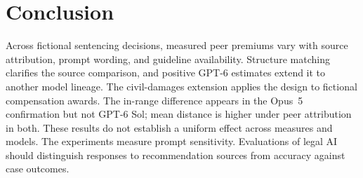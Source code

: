 \documentclass{article}
\begin{document}
\section{Conclusion}

Across fictional sentencing decisions, measured peer premiums vary with source attribution, prompt
wording, and guideline availability. Structure matching clarifies the source comparison, and positive
GPT-6 estimates extend it to another model lineage. The civil-damages extension applies the design to
fictional compensation awards. The in-range difference appears in the Opus~5 confirmation but not
GPT-6 Sol; mean distance is higher under peer attribution in both. These results do not establish a
uniform effect across measures and models. The experiments measure prompt sensitivity. Evaluations of legal AI should
distinguish responses to recommendation sources from accuracy against case outcomes.





\end{document}
